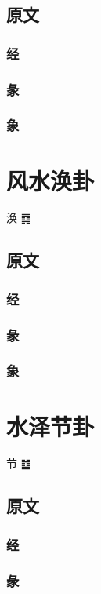 \documentclass[12pt,oneside]{book}
\begin{document}
\section{原文}

\subsection{经}

\subsection{彖}

\subsection{象}

\chapter{风水涣卦}
涣 {\Large ䷺}
\section{原文}

\subsection{经}

\subsection{彖}

\subsection{象}

\chapter{水泽节卦}
节 {\Large ䷻}
\section{原文}

\subsection{经}

\subsection{彖}
\end{document}
